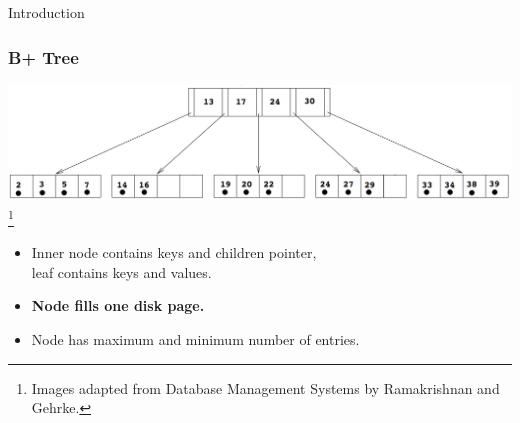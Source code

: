 \documentclass{beamer}
\newcommand\blfootnote[1]{%
  \begingroup
  \renewcommand\thefootnote{}\footnote{#1}%
  \addtocounter{footnote}{-1}%
  \endgroup
}
\begin{document}
\begin{section}{Introduction}
    \begin{frame}
      \frametitle{B+ Tree}
      \pause
      \vspace{-1em}
      \includegraphics[scale=0.2]{B+Tree.png}
      \blfootnote{\tiny Images adapted from Database Management Systems by Ramakrishnan and Gehrke.}
      \vspace{2em}
      \begin{itemize}
        \item Inner node contains keys and children pointer, \\leaf contains keys and values.
        \pause
        \item \textbf{Node fills one disk page.}
        \pause
        \item Node has maximum and minimum number of entries.
      \end{itemize}
    \end{frame}


\end{section}
\end{document}
